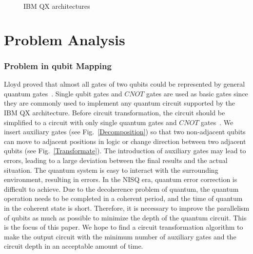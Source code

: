 \documentclass[runningheads]{llncs}
\begin{document}
\begin{figure}
{
}
\caption{IBM QX architectures}
\label{IBM}
\end{figure}

\section{Problem Analysis}
\label{Problem Analysis}

\subsubsection{Problem in qubit Mapping}
Lloyd proved that almost all gates of two qubits could be represented by general quantum gates~\cite{Lloyd1995Almost}. Single qubit gates and $CNOT$ gates are used as basic gates since they are commonly used to implement any quantum circuit supported by the IBM QX architecture. Before circuit transformation, the circuit should be simplified to a circuit with only single quantum gates and $CNOT$ gates~\cite{2005Mttnen,1995Barenco}. We insert auxiliary gates (see Fig.~\ref{Decomposition}) so that two non-adjacent qubits can move to adjacent positions in logic or change direction between two adjacent qubits (see Fig.~\ref{Transformate}). The introduction of auxiliary gates may lead to errors, leading to a large deviation between the final results and the actual situation. The quantum system is easy to interact with the surrounding environment, resulting in errors. In the NISQ era, quantum error correction is difficult to achieve. Due to the decoherence problem of quantum, the quantum operation needs to be completed in a coherent period, and the time of quantum in the coherent state is short. Therefore, it is necessary to improve the parallelism of qubits as much as possible to minimize the depth of the quantum circuit. This is the focus of this paper. We hope to find a circuit transformation algorithm to make the output circuit with the minimum number of auxiliary gates and the circuit depth in an acceptable amount of time.
\end{document}

